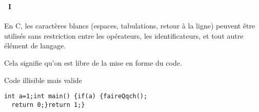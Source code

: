 \begin{frame}[containsverbatim]
  \frametitle{\secname}
  \framesubtitle{\subsecname~I}
  En C, les caractères blancs (espaces, tabulations, retour à la ligne) peuvent être utilisés sans restriction entre les opérateurs, les identificateurs, et tout autre élément de langage.
  \vspace{0.5cm}
  \par
  Cela signifie qu'on est libre de la mise en forme du code.
  \begin{exampleblock}{Code illisible mais valide}
    \begin{verbatim}
int a=1;int main() {if(a) {faireQqch(); 
  return 0;}return 1;}\end{verbatim}
  \end{exampleblock}
\end{frame}

